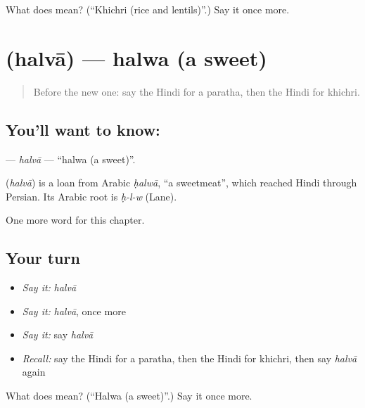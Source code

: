 \begin{tcolorbox}[breakable,colback=teal!4,colframe=teal!35!black,title={Before you move on}]
What does  mean? (\textquotedblleft{}Khichri (rice and lentils)\textquotedblright{}.) Say it once more.
\end{tcolorbox}
\section[\texorpdfstring{\hi{हलवा} (halvā)}{हलवा (halvā)}]{ (halvā) — halwa (a sweet)}

\label{lesson:HI-C210-halva}



\begin{quote}
Before the new one: say the Hindi for a paratha, then the Hindi for khichri.
\end{quote}

\subsection*{You'll want to know: }
\textbf{} — \emph{halvā} — \textquotedblleft{}halwa (a sweet)\textquotedblright{}.

\begin{cousinweb}
\textbf{} (\emph{halvā}) is a loan from Arabic \emph{ḥalwā}, \textquotedblleft{}a sweetmeat\textquotedblright{}, which reached Hindi through Persian. Its Arabic root is \emph{ḥ-l-w} (Lane).
\end{cousinweb}

\begin{grammarlens}[title={What you've built}]
One more word for this chapter.
\end{grammarlens}

\subsection*{Your turn}
\begin{itemize}
\raggedright
  \item \emph{Say it:} \emph{halvā}
  \item \emph{Say it:} \emph{halvā}, once more
  \item \emph{Say it:} say \emph{halvā}
  \item \emph{Recall:} say the Hindi for a paratha, then the Hindi for khichri, then say \emph{halvā} again
\end{itemize}

\begin{tcolorbox}[breakable,colback=teal!4,colframe=teal!35!black,title={Before you move on}]
What does  mean? (\textquotedblleft{}Halwa (a sweet)\textquotedblright{}.) Say it once more.
\end{tcolorbox}

